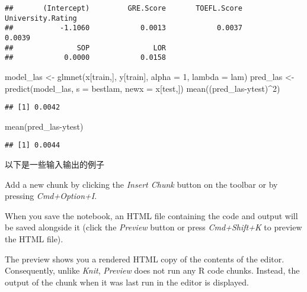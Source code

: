 \documentclass[
]{article}
\newenvironment{Shaded}{\begin{snugshade}}{\end{snugshade}}
\newcommand{\AttributeTok}[1]{\textcolor[rgb]{0.77,0.63,0.00}{#1}}
\newcommand{\DecValTok}[1]{\textcolor[rgb]{0.00,0.00,0.81}{#1}}
\newcommand{\FunctionTok}[1]{\textcolor[rgb]{0.00,0.00,0.00}{#1}}
\newcommand{\NormalTok}[1]{#1}
\newcommand{\OtherTok}[1]{\textcolor[rgb]{0.56,0.35,0.01}{#1}}
\newcommand{\SpecialCharTok}[1]{\textcolor[rgb]{0.00,0.00,0.00}{#1}}
\begin{document}
\begin{verbatim}
##       (Intercept)         GRE.Score       TOEFL.Score University.Rating 
##           -1.1060            0.0013            0.0037            0.0039 
##               SOP               LOR 
##            0.0000            0.0158
\end{verbatim}

\begin{Shaded}
\begin{Highlighting}[]
\NormalTok{model\_las }\OtherTok{\textless{}{-}} \FunctionTok{glmnet}\NormalTok{(x[train,], y[train], }\AttributeTok{alpha =} \DecValTok{1}\NormalTok{, }\AttributeTok{lambda =}\NormalTok{ lam)}
\NormalTok{pred\_las }\OtherTok{\textless{}{-}} \FunctionTok{predict}\NormalTok{(model\_las, }\AttributeTok{s =}\NormalTok{ bestlam, }\AttributeTok{newx =}\NormalTok{ x[test,])}
\FunctionTok{mean}\NormalTok{((pred\_las}\SpecialCharTok{{-}}\NormalTok{ytest)}\SpecialCharTok{\^{}}\DecValTok{2}\NormalTok{)}
\end{Highlighting}
\end{Shaded}

\begin{verbatim}
## [1] 0.0042
\end{verbatim}

\begin{Shaded}
\begin{Highlighting}[]
\FunctionTok{mean}\NormalTok{(pred\_las}\SpecialCharTok{{-}}\NormalTok{ytest)}
\end{Highlighting}
\end{Shaded}

\begin{verbatim}
## [1] 0.0044
\end{verbatim}

以下是一些输入输出的例子

Add a new chunk by clicking the \emph{Insert Chunk} button on the
toolbar or by pressing \emph{Cmd+Option+I}.

When you save the notebook, an HTML file containing the code and output
will be saved alongside it (click the \emph{Preview} button or press
\emph{Cmd+Shift+K} to preview the HTML file).

The preview shows you a rendered HTML copy of the contents of the
editor. Consequently, unlike \emph{Knit}, \emph{Preview} does not run
any R code chunks. Instead, the output of the chunk when it was last run
in the editor is displayed.
\end{document}
